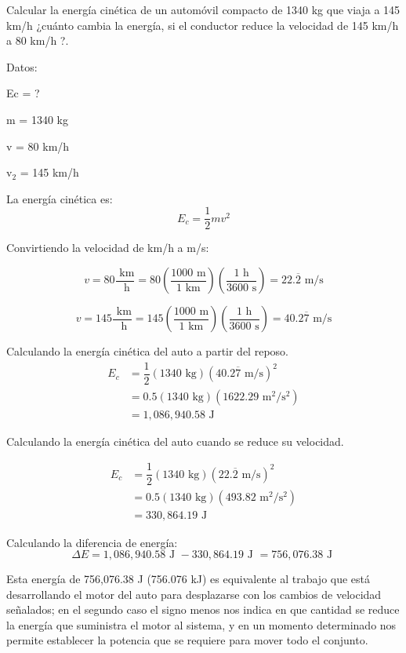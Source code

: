 \question[10] Calcular la energía cinética de un automóvil compacto de 1340 kg que viaja a 145 km/h ¿cuánto cambia la energía, si el conductor reduce la velocidad de 145 km/h a 80 km/h ?.

\begin{solutionbox}{14cm}
    \begin{multicols}{2}
        Datos:

        Ec = ?

        m = 1340 kg

        v = 80 km/h

        v$_2$ = 145 km/h

        La energía cinética es:
        \[E_c=\frac{1}{2}mv^2\]

        Convirtiendo la velocidad de km/h a m/s:

        \[v=80\dfrac{\text{ km}}{\text{ h}}=80\left(\dfrac{1000 \text{ m}}{1 \text{ km}}\right)\left(\dfrac{1 \text{ h}}{3600 \text{ s}}\right)=22.\overline{2} \text{ m/s}\]

        \[v=145\dfrac{\text{ km}}{\text{ h}}=145\left(\dfrac{1000 \text{ m}}{1 \text{ km}}\right)\left(\dfrac{1 \text{ h}}{3600 \text{ s}}\right)=40.2\overline{7} \text{ m/s}\]

        \vspace{2cm}

        Calculando la energía cinética del auto a partir del reposo.
        \[
            \begin{array}{rl}
                E_c & = \dfrac{1}{2} (1340 \text{ kg})(40.2\overline{7} \text{ m/s})^2 \\[1em]
                    & = 0.5 (1340 \text{ kg})(1622.29 \text{ m$^2$/s$^2$})             \\[1em]
                    & =1,086,940.58 \text{ J }
            \end{array}
        \]

        Calculando la energía cinética del auto cuando se reduce su velocidad.

        \[
            \begin{array}{rl}
                E_c & = \dfrac{1}{2} (1340 \text{ kg})(22.\overline{2} \text{ m/s})^2 \\[1em]
                    & = 0.5 (1340 \text{ kg})(493.82 \text{ m$^2$/s$^2$})             \\[1em]
                    & =330,864.19 \text{ J }
            \end{array}
        \]

        Calculando la diferencia de energía:
        \[\Delta E = 1,086,940.58 \text{ J } - 330,864.19 \text{ J } = 756,076.38 \text{ J } \]

        Esta energía de 756,076.38 J (756.076 kJ) es equivalente al trabajo que está desarrollando el motor del auto para desplazarse con los cambios de velocidad señalados; en el segundo caso el signo menos nos indica en que cantidad se reduce la energía que suministra el motor al sistema, y en un momento determinado nos permite establecer la potencia que se requiere para mover todo el conjunto.
    \end{multicols}
\end{solutionbox}
